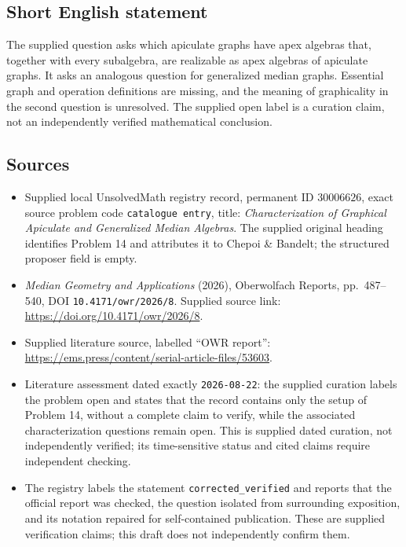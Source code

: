 \documentclass[11pt]{article}
\begin{document}
\subsection{Short English statement}
The supplied question asks which apiculate graphs have apex algebras that, together with every subalgebra, are realizable as apex algebras of apiculate graphs. It asks an analogous question for generalized median graphs. Essential graph and operation definitions are missing, and the meaning of graphicality in the second question is unresolved. The supplied open label is a curation claim, not an independently verified mathematical conclusion.
\subsection{Sources}
\begin{itemize}
\item Supplied local UnsolvedMath registry record, permanent ID \(30006626\), exact source problem code \texttt{catalogue entry}, title: \emph{Characterization of Graphical Apiculate and Generalized Median Algebras}. The supplied original heading identifies Problem 14 and attributes it to Chepoi \& Bandelt; the structured proposer field is empty.
\item \emph{Median Geometry and Applications} (2026), Oberwolfach Reports, pp.\ 487--540, DOI \texttt{10.4171/owr/2026/8}. Supplied source link: \url{https://doi.org/10.4171/owr/2026/8}.
\item Supplied literature source, labelled ``OWR report'': \url{https://ems.press/content/serial-article-files/53603}.
\item Literature assessment dated exactly \texttt{2026-08-22}: the supplied curation labels the problem open and states that the record contains only the setup of Problem 14, without a complete claim to verify, while the associated characterization questions remain open. This is supplied dated curation, not independently verified; its time-sensitive status and cited claims require independent checking.
\item The registry labels the statement \texttt{corrected\_verified} and reports that the official report was checked, the question isolated from surrounding exposition, and its notation repaired for self-contained publication. These are supplied verification claims; this draft does not independently confirm them.
\end{itemize}
\end{document}
